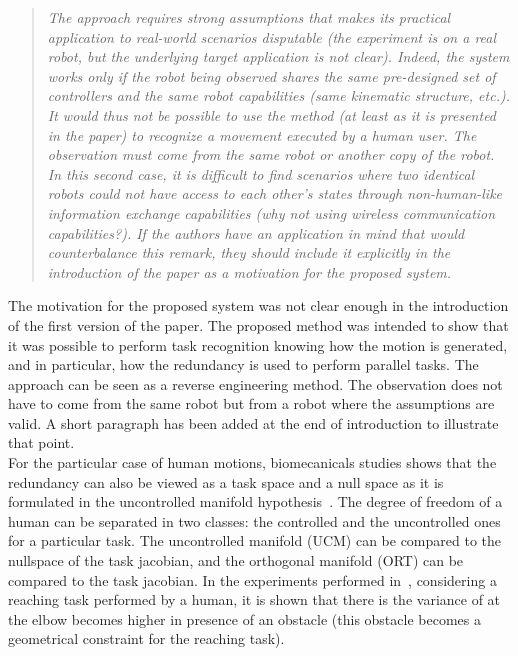 \documentclass[11pt]{article}
\begin{document}
\begin{quote}
\textit{
The approach requires strong assumptions that makes its practical application to real-world scenarios disputable (the experiment is on a real robot, but the underlying target application is not clear). Indeed, the system works only if the robot being observed shares the same pre-designed set of controllers and the same robot capabilities (same kinematic structure, etc.). It would thus not be possible to use the method (at least as it is presented in the paper) to recognize a movement executed by a human user. The observation must come from the same robot or another copy of the robot. In this second case, it is difficult to find scenarios where two identical robots could not have access to each other's states through non-human-like information exchange capabilities (why not using wireless communication capabilities?). If the authors have an application in mind that would counterbalance this remark, they should include it explicitly in the introduction of the paper as a motivation for the proposed system.
}
\end{quote}
The motivation for the proposed system was not clear enough in the introduction of the first version of the paper.
The proposed method was intended to show that it was possible to perform task recognition 
knowing how the motion is generated, and in particular, how the redundancy
is used to perform parallel tasks. The approach can be seen as a reverse engineering method.
The observation does not have to come from the same robot but from a robot where the 
assumptions are valid. A short paragraph has been added at the end of introduction to
illustrate that point.\\

For the particular case of human motions, biomecanicals studies
shows that the redundancy can also be viewed as a task space and a null space as it 
is formulated in the uncontrolled manifold hypothesis~\cite{scholz99}.
The degree of freedom of a human can be separated in two classes:
the controlled and the uncontrolled ones for a particular task.
The uncontrolled manifold (UCM) can be compared to the nullspace of the task jacobian,
and the orthogonal manifold (ORT) can be compared to the task jacobian.
In the experiments performed in~\cite{jacquierbret09},
considering a reaching task performed by a human, it is shown that there is the variance
of at the elbow becomes higher in presence of an obstacle (this obstacle becomes 
a geometrical constraint for the reaching task).
\end{document}
